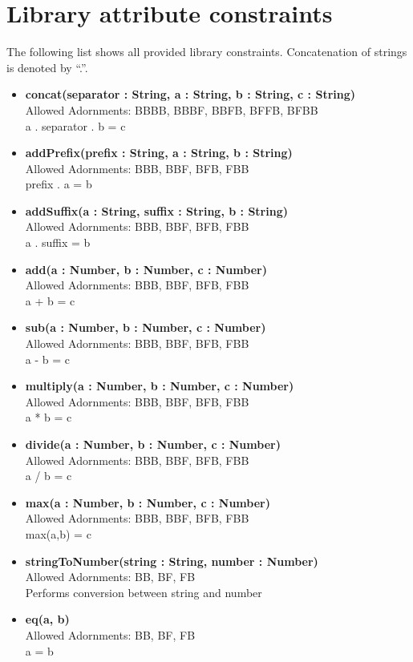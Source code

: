 \chapter{Library attribute constraints}
\label{chap:libraryConstraints}
	
The following list shows all provided library constraints. Concatenation of
strings is denoted by ``.''. 
	
\begin{itemize}
\item
\textbf{concat(separator : String, a : String, b : String, c : String)} \\
Allowed Adornments: BBBB, BBBF, BBFB, BFFB, BFBB \\
a . separator . b = c 
\item
\textbf{addPrefix(prefix : String, a : String, b : String)} \\
Allowed Adornments: BBB, BBF, BFB, FBB  \\
prefix . a = b
\item
\textbf{addSuffix(a : String, suffix : String, b : String)} \\
Allowed Adornments: BBB, BBF, BFB, FBB \\
a . suffix = b 
\item
\textbf{add(a : Number, b : Number, c : Number)} \\
Allowed Adornments: BBB, BBF, BFB, FBB \\
a + b = c 
\item
\textbf{sub(a : Number, b : Number, c : Number)} \\
Allowed Adornments: BBB, BBF, BFB, FBB \\
a - b = c 
\item
\textbf{multiply(a : Number, b : Number, c : Number)} \\
Allowed Adornments: BBB, BBF, BFB, FBB \\
a * b = c 
\item
\textbf{divide(a : Number, b : Number, c : Number)} \\
Allowed Adornments: BBB, BBF, BFB, FBB \\
a / b = c 
\item
\textbf{max(a : Number, b : Number, c : Number)} \\
Allowed Adornments: BBB, BBF, BFB, FBB \\
max(a,b) = c

\item
\textbf{stringToNumber(string : String, number : Number)} \\
Allowed Adornments: BB, BF, FB \\
Performs conversion between string and number
\item
\textbf{eq(a, b)} \\
Allowed Adornments: BB, BF, FB \\
a = b 
\end{itemize}